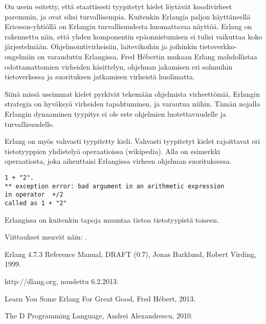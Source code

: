 \documentclass[11pt,oneside,a4paper]{article}
\begin{document}
On usein esitetty, että staattisesti tyypitetyt kielet löytävät koodivirheet
paremmin, ja ovat siksi turvallisempia. Kuitenkin Erlangia paljon käyttäneellä
Ericsson-yhtiöllä on Erlangin turvallisuudesta huomattavaa näyttöä. Erlang on
rakennettu niin, että yhden komponentin epäonnistumisen ei tulisi vaikuttaa koko
järjestelmään. Ohjelmointivirheisiin, laitevikoihin ja joihinkin
tietoverkko-ongelmiin on varauduttu Erlangissa. Fred Hébertin mukaan Erlang
mahdollistaa odottamattomien virheiden käsittelyn, ohjelman jakamisen eri
solmuihin tietoverkossa ja suorituksen jatkamisen virheistä huolimatta.

Siinä missä useimmat kielet pyrkivät tekemään ohjelmista virheettömiä, Erlangin
strategia on hyväksyä virheiden tapahtuminen, ja varautua niihin. Tämän nojalla
Erlangin dynaaminen tyypitys ei ole este ohjelmien luotettavuudelle ja
turvallisuudelle.

Erlang on myös vahvasti tyypitetty kieli. Vahvasti tyypitetyt kielet rajoittavat
eri tietotyyppien yhdistelyä operaatioissa (wikipedia). Alla on esimerkki
operaatiosta, joka aiheuttaisi Erlangissa virheen ohjelman suorituksessa.

\begin{verbatim}
1 + "2".
** exception error: bad argument in an arithmetic expression
in operator  +/2
called as 1 + "2"
\end{verbatim}
Erlangissa on kuitenkin tapoja muuntaa tietoa tietotyypistä toiseen.

Viittaukset menvät näin: \cite{HEB13}.




\begin{thebibliography}{99}

 Erlang 4.7.3 Reference Manual, DRAFT (0.7), Jonas
Barklund, Robert Virding, 1999. 

 http://dlang.org, noudettu 6.2.2013.

 Learn You Some Erlang For Great Good, Fred Hébert, 2013.

 The D Programming Language, Andrei Alexandrescu, 2010.

\end{thebibliography}
\end{document}
